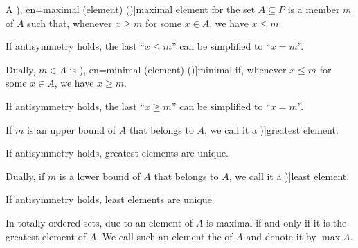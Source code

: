 \begin{definition}
\begin{thmenum}
    \begin{paracol}{2}
      \begin{leftcolumn}\mimprovised
        A \term[ru=максимальный (елемент) (\cite[def. 3.6]{Гуров2013Решётки}), en=maximal (element) (\cite[33]{Harzheim2005OrderedSets})]{maximal element} for the set \( A \subseteq P \) is a member \( m \) of \( A \) such that, whenever \( x \geq m \) for some \( x \in A \), we have \( x \leq m \).

        If antisymmetry holds, the last \enquote{\( x \leq m \)} can be simplified to \enquote{\( x = m \)}.
      \end{leftcolumn}

      \begin{rightcolumn}
        Dually, \( m \in A \) is \term[ru=минимальный (елемент) (\cite[def. 3.6]{Гуров2013Решётки}), en=minimal (element) (\cite[33]{Harzheim2005OrderedSets})]{minimal} if, whenever \( x \leq m \) for some \( x \in A \), we have \( x \geq m \).

        If antisymmetry holds, the last \enquote{\( x \geq m \)} can be simplified to \enquote{\( x = m \)}.
      \end{rightcolumn}
    \end{paracol}

    \begin{paracol}{2}
      \begin{leftcolumn}
        If \( m \) is an upper bound of \( A \) that belongs to \( A \), we call it a \term[ru=наибольший (елемент) (\cite[def. 3.6]{Гуров2013Решётки})]{greatest element}.

        If antisymmetry holds, greatest elements are unique.
      \end{leftcolumn}

      \begin{rightcolumn}
        Dually, if \( m \) is a lower bound of \( A \) that belongs to \( A \), we call it a \term[ru=наименьший (елемент) (\cite[def. 3.6]{Гуров2013Решётки})]{least element}.

        If antisymmetry holds, least elements are unique
      \end{rightcolumn}
    \end{paracol}

    \begin{paracol}{2}
      \begin{leftcolumn}\mimprovised
        In totally ordered sets, due to  an element of \( A \) is maximal if and only if it is the greatest element of \( A \). We call such an element the  of \( A \) and denote it by \( \max A \).
      \end{leftcolumn}


\end{paracol}
\end{thmenum}
\end{definition}
